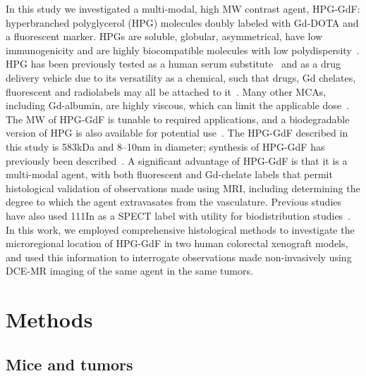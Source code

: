In this study we investigated a multi-modal, high MW contrast agent, HPG-GdF: hyperbranched polyglycerol (HPG) molecules doubly labeled with Gd-DOTA and a fluorescent marker.
HPGs are soluble, globular, asymmetrical, have low immunogenicity and are highly biocompatible molecules with low polydispersity~\cite{Saatchi:2012hc,Kainthan:2006ce,Saatchi:2012gc}.
HPG has been previously tested as a human serum substitute~\cite{Kainthan:2008ek} and as a drug delivery vehicle due to its versatility as a chemical, such that drugs, Gd chelates, fluorescent and radiolabels may all be attached to it~\cite{Shenoi:2013id}.
Many other MCAs, including Gd-albumin, are highly viscous, which can limit the applicable dose~\cite{Imranulhaq:2012ij}.
The MW of HPG-GdF is tunable to required applications, and a biodegradable version of HPG is also available for potential use~\cite{Shenoi:2013id}.
The HPG-GdF described in this study is 583kDa and 8–10nm in diameter; synthesis of HPG-GdF has previously been described~\cite{Saatchi:2012hc}.
A significant advantage of HPG-GdF is that it is a multi-modal agent, with both fluorescent and Gd-chelate labels that permit histological validation of observations made using MRI, including determining the degree to which the agent extravasates from the vasculature.
Previous studies have also used 111In as a SPECT label with utility for biodistribution studies~\cite{Saatchi:2012hc}.
In this work, we employed comprehensive histological methods to investigate the microregional location of HPG-GdF in two human colorectal xenograft models, and used this information to interrogate observations made non-invasively using DCE-MR imaging of the same agent in the same tumors.

\section{Methods}

\subsection{Mice and tumors}

